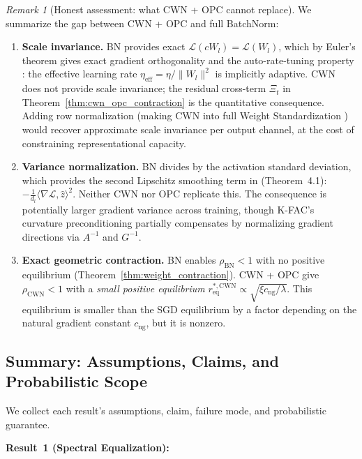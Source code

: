 \documentclass{article}
\providecommand{\norm}[1]{\lVert #1 \rVert}
\theoremstyle{plain}
\theoremstyle{definition}
\theoremstyle{remark}
\newtheorem{remark}{Remark}
\begin{document}
\begin{remark}[Honest assessment: what CWN + OPC cannot replace]
\label{rem:cwn_opc_limitations}
We summarize the gap between CWN + OPC and full BatchNorm:
\begin{enumerate}
    \item \textbf{Scale invariance.} BN provides exact $\mathcal{L}(cW_l) = \mathcal{L}(W_l)$, which by Euler's theorem gives exact gradient orthogonality and the auto-rate-tuning property \citep{arora2019theoretical}: the effective learning rate $\eta_{\mathrm{eff}} = \eta/\norm{W_l}^2$ is implicitly adaptive. CWN does not provide scale invariance; the residual cross-term $\Xi_t$ in Theorem~\ref{thm:cwn_opc_contraction} is the quantitative consequence. Adding row normalization (making CWN into full Weight Standardization \citep{qiao2019ws}) would recover approximate scale invariance per output channel, at the cost of constraining representational capacity.
    \item \textbf{Variance normalization.} BN divides by the activation standard deviation, which provides the second Lipschitz smoothing term in \citet{santurkar2018does} (Theorem~4.1): $-\frac{1}{d_l}\langle \nabla\mathcal{L}, \hat{z}\rangle^2$. Neither CWN nor OPC replicate this. The consequence is potentially larger gradient variance across training, though K-FAC's curvature preconditioning partially compensates by normalizing gradient directions via $A^{-1}$ and $G^{-1}$.
    \item \textbf{Exact geometric contraction.} BN enables $\rho_{\mathrm{BN}} < 1$ with no positive equilibrium (Theorem~\ref{thm:weight_contraction}). CWN + OPC give $\rho_{\mathrm{CWN}} < 1$ with a \emph{small positive equilibrium} $r_{\mathrm{eq}}^{*,\mathrm{CWN}} \propto \sqrt{\xi c_{\mathrm{ng}}/\lambda}$. This equilibrium is smaller than the SGD equilibrium by a factor depending on the natural gradient constant $c_{\mathrm{ng}}$, but it is nonzero.
\end{enumerate}
\end{remark}

\subsection{Summary: Assumptions, Claims, and Probabilistic Scope}
\label{sec:summary_table}

We collect each result's assumptions, claim, failure mode, and probabilistic guarantee.

\textbf{Result~1 (Spectral Equalization):}
\end{document}
